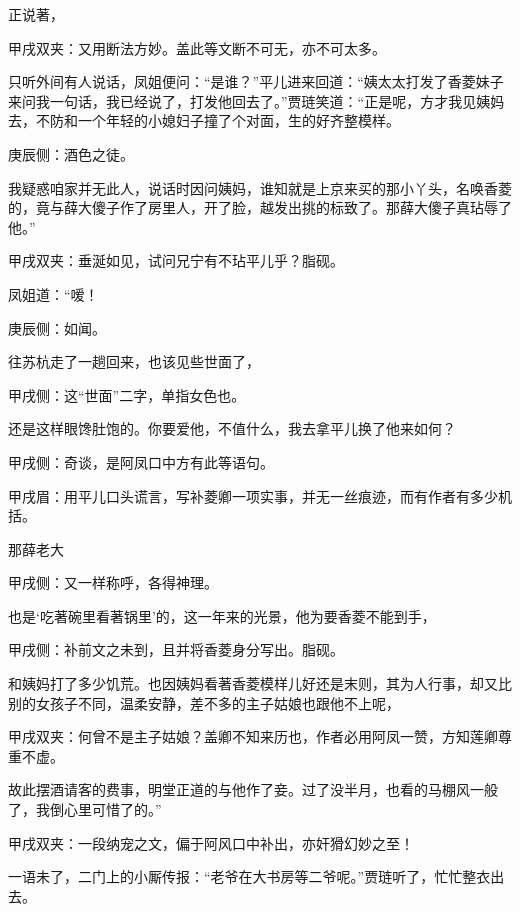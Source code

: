 \begin{parag}
    正说著，\begin{note}甲戌双夹：又用断法方妙。盖此等文断不可无，亦不可太多。\end{note}只听外间有人说话，凤姐便问：“是谁？”平儿进来回道：“姨太太打发了香菱妹子来问我一句话，我已经说了，打发他回去了。”贾琏笑道：“正是呢，方才我见姨妈去，不防和一个年轻的小媳妇子撞了个对面，生的好齐整模样。\begin{note}庚辰侧：酒色之徒。\end{note}我疑惑咱家并无此人，说话时因问姨妈，谁知就是上京来买的那小丫头，名唤香菱的，竟与薛大傻子作了房里人，开了脸，越发出挑的标致了。那薛大傻子真玷辱了他。”\begin{note}甲戌双夹：垂涎如见，试问兄宁有不玷平儿乎？脂砚。\end{note}凤姐道：“嗳！\begin{note}庚辰侧：如闻。\end{note}往苏杭走了一趟回来，也该见些世面了，\begin{note}甲戌侧：这“世面”二字，单指女色也。\end{note}还是这样眼馋肚饱的。你要爱他，不值什么，我去拿平儿换了他来如何？\begin{note}甲戌侧：奇谈，是阿凤口中方有此等语句。\end{note}\begin{note}甲戌眉：用平儿口头谎言，写补菱卿一项实事，并无一丝痕迹，而有作者有多少机括。\end{note}那薛老大\begin{note}甲戌侧：又一样称呼，各得神理。\end{note}也是‘吃著碗里看著锅里’的，这一年来的光景，他为要香菱不能到手，\begin{note}甲戌侧：补前文之未到，且并将香菱身分写出。脂砚。\end{note}和姨妈打了多少饥荒。也因姨妈看著香菱模样儿好还是末则，其为人行事，却又比别的女孩子不同，温柔安静，差不多的主子姑娘也跟他不上呢，\begin{note}甲戌双夹：何曾不是主子姑娘？盖卿不知来历也，作者必用阿凤一赞，方知莲卿尊重不虚。\end{note}故此摆酒请客的费事，明堂正道的与他作了妾。过了没半月，也看的马棚风一般了，我倒心里可惜了的。”\begin{note}甲戌双夹：一段纳宠之文，偏于阿风口中补出，亦奸猾幻妙之至！\end{note}一语未了，二门上的小厮传报：“老爷在大书房等二爷呢。”贾琏听了，忙忙整衣出去。
\end{parag}


